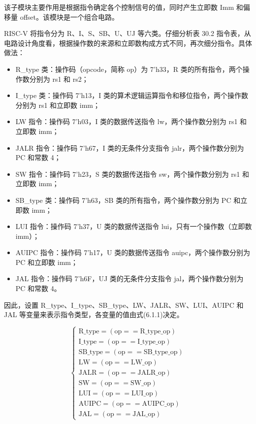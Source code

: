 \documentclass[12pt,a4paper]{article}
\begin{document}
该子模块主要作用是根据指令确定各个控制信号的值，同时产生立即数 Imm 和偏移量 offset。该模块是一个组合电路。

RISC-V 将指令分为 R、I、S、SB、U、UJ 等六类。仔细分析表 30.2 指令表，从电路设计角度看，根据操作数的来源和立即数构成方式不同，再次细分指令。具体做法：

\begin{itemize}
    \item R\_type 类：操作码（opcode，简称 op）为 7'h33，R 类的所有指令，两个操作数分别为 rs1 和 rs2；
    \item I\_type 类：操作码 7'h13，I 类的算术逻辑运算指令和移位指令，两个操作数分别为 rs1 和立即数 imm；
    \item LW 指令：操作码 7'h03，I 类的数据传送指令 lw，两个操作数分别为 rs1 和立即数 imm；
    \item JALR 指令：操作码 7'h67，I 类的无条件分支指令 jalr，两个操作数分别为 PC 和常数 4；
    \item SW 指令：操作码 7'h23，S 类的数据传送指令 sw，两个操作数分别为 rs1 和立即数 imm；
    \item SB\_type 类：操作码 7'h63，SB 类的所有指令，两个操作数分别为 PC 和立即数 imm；
    \item LUI 指令：操作码 7'h37，U 类的数据传送指令 lui，只有一个操作数（立即数 imm）；
    \item AUIPC 指令：操作码 7'h17，U 类的数据传送指令 auipc，两个操作数分别为 PC 和立即数 imm；
    \item JAL 指令：操作码 7'h6F，UJ 类的无条件分支指令 jal，两个操作数分别为 PC 和常数 4。
\end{itemize}

因此，设置 R\_type、I\_type、SB\_type、LW、JALR、SW、LUI、AUIPC 和 JAL 等变量来表示指令类型，各变量的值由式(6.1.1)决定。

\begin{equation}
\begin{cases}
\text{R\_type} = (\text{op} == \text{R\_type\_op}) \\
\text{I\_type} = (\text{op} == \text{I\_type\_op}) \\
\text{SB\_type} = (\text{op} == \text{SB\_type\_op}) \\
\text{LW} = (\text{op} == \text{LW\_op}) \\
\text{JALR} = (\text{op} == \text{JALR\_op}) \\
\text{SW} = (\text{op} == \text{SW\_op}) \\
\text{LUI} = (\text{op} == \text{LUI\_op}) \\
\text{AUIPC} = (\text{op} == \text{AUIPC\_op}) \\
\text{JAL} = (\text{op} == \text{JAL\_op})
\end{cases}
\tag{6.1.1}
\end{equation}
\end{document}
